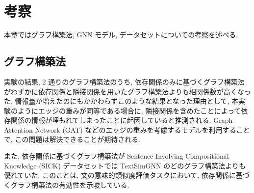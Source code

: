 \documentclass[a4j,twoside,12pt]{thesis} %
\begin{document}
\addtocounter{chapter}{+4}
\setlength{\baselineskip}{1.95zw}
\setlength{\textheight}{30\baselineskip}
\mainmatter

\fi

\chapter{考察}\label{dis}
本章ではグラフ構築法, GNN モデル, データセットについての考察を述べる.
\section{グラフ構築法}
実験の結果, 2 通りのグラフ構築法のうち, 依存関係のみに基づくグラフ構築法がわずかに依存関係と隣接関係を用いたグラフ構築法よりも相関係数が高くなった.
情報量が増えたのにもかかわらずこのような結果となった理由として, 本実験のようにエッジの重みが同等である場合に, 隣接関係を含めたことによって依存関係の情報が埋もれてしまったことに起因していると推測される. Graph Attention Network (GAT) などのエッジの重みを考慮するモデルを利用することで, この問題は解決できることが期待される.
\par また, 依存関係に基づくグラフ構築法が Sentence Involving Compositional Knowledge (SICK) \cite{beltagy:arxiv15} データセットでは TextSimGNN \cite{zhou2020sentence} のどのグラフ構築法よりも優れていた. このことは, 文の意味的類似度評価タスクにおいて, 依存関係に基づくグラフ構築法の有効性を示唆している.
\end{document}

